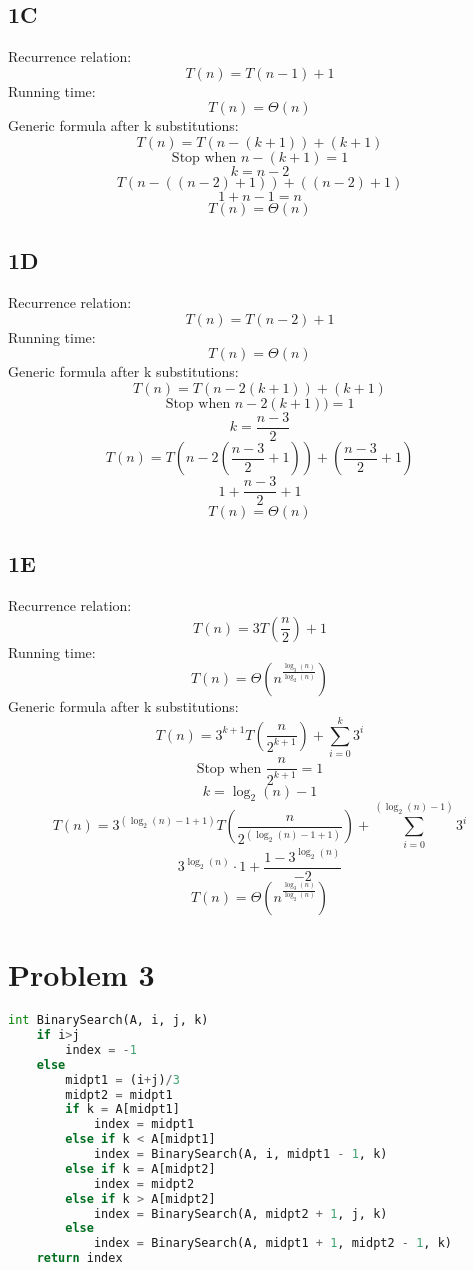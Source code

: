 \documentclass[14pt]{extarticle}
\begin{document}
\subsection*{1C}
Recurrence relation:
$$T(n) = T(n-1) + 1$$
Running time:
$$T(n) = \Theta(n)$$
Generic formula after k substitutions:
\begin{equation}
T(n) = T(n-(k+1)) + (k+1)
\end{equation}
$$\text{Stop when } n - (k+1) = 1$$
$$k = n-2$$
\begin{equation}
T(n - ((n - 2) + 1)) + ((n - 2) + 1)
\end{equation}
$$1 + n - 1 = n$$
$$T(n) = \Theta(n)$$
\subsection*{1D}
Recurrence relation:
$$T(n) = T(n-2) + 1$$
Running time:
$$T(n) = \Theta(n)$$
Generic formula after k substitutions:
\begin{equation}
T(n) = T(n-2(k+1)) + (k+1)
\end{equation}
$$\text{Stop when } n-2(k+1)) = 1$$
$$k = \frac{n-3}{2}$$
$$T(n) = T\left(n - 2\left(\frac{n-3}{2}+1\right)\right) + \left(\frac{n-3}{2} + 1\right)$$
$$1 + \frac{n-3}{2} + 1$$
$$T(n) = \Theta(n)$$
\subsection*{1E}
Recurrence relation:
$$T(n) = 3T\left(\frac{n}{2}\right) + 1$$
Running time:
$$T(n) = \Theta(n^{\frac{\log_3(n)}{\log_2(n)}})$$
Generic formula after k substitutions:
\begin{equation}
T(n) = 3^{k+1}T\left(\frac{n}{2^{k+1}}\right) + \sum_{i=0}^{k} 3^i
\end{equation}
$$\text{Stop when } \frac{n}{2^{k+1}} = 1$$
$$k = \log_2(n) - 1$$
\begin{equation}
T(n) = 3^{(\log_2(n) - 1 + 1)}T\left(\frac{n}{2^{(\log_2(n) - 1 + 1)}}\right) + \sum_{i=0}^{(\log_2(n) - 1)} 3^i
\end{equation}
$$3^{\log_2(n)} \cdot 1 + \frac{{1 - 3^{\log_2(n)}}}{-2}$$
$$T(n) = \Theta(n^{\frac{\log_3(n)}{\log_2(n)}})$$




\section*{Problem 3}
\begin{lstlisting}[language=Python]
int BinarySearch(A, i, j, k)
	if i>j
		index = -1
	else
		midpt1 = (i+j)/3
		midpt2 = midpt1
		if k = A[midpt1]
			index = midpt1
		else if k < A[midpt1]
			index = BinarySearch(A, i, midpt1 - 1, k)
		else if k = A[midpt2]
			index = midpt2
		else if k > A[midpt2]
			index = BinarySearch(A, midpt2 + 1, j, k)
		else
			index = BinarySearch(A, midpt1 + 1, midpt2 - 1, k)
	return index
\end{lstlisting}
\end{document}
